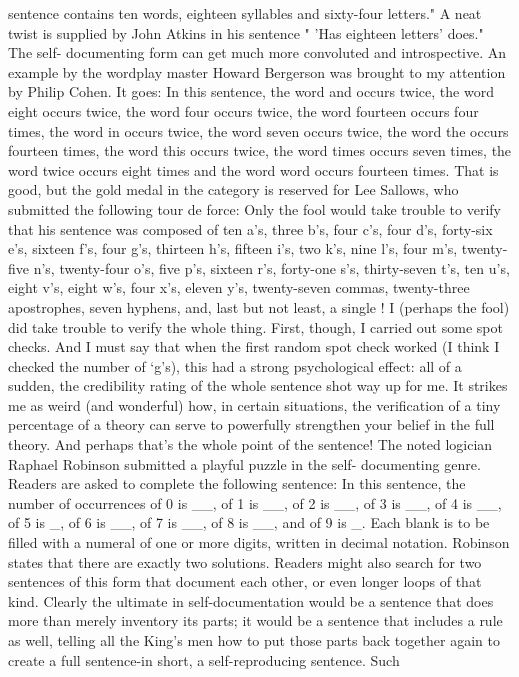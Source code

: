 sentence contains ten words, eighteen syllables and sixty-four letters." A neat twist is supplied by John Atkins in his sentence " 'Has eighteen letters' does." The self- documenting form can get much more convoluted and introspective. An example by the wordplay master Howard Bergerson was brought to my attention by Philip Cohen. It goes: 
In this sentence, the word and occurs twice, the word eight occurs twice, the word four occurs twice, the word fourteen occurs four times, the word in occurs twice, the word seven occurs twice, the word the occurs fourteen times, the word this occurs twice, the word times occurs seven times, the word twice occurs eight times and the word word occurs fourteen times. 
That is good, but the gold medal in the category is reserved for Lee Sallows, who submitted the following tour de force: 
Only the fool would take trouble to verify that his sentence was composed of ten a's, three b's, four c's, four d's, forty-six e's, sixteen f's, four g's, thirteen h's, fifteen i's, two k's, nine l's, four m's, twenty-five n's, twenty-four o's, five p's, sixteen r's, forty-one s's, thirty-seven t's, ten u's, eight v's, eight w's, four x's, eleven y's, twenty-seven commas, twenty-three apostrophes, seven hyphens, and, last but not least, a single ! 
I (perhaps the fool) did take trouble to verify the whole thing. First, though, I carried out some spot checks. And I must say that when the first random spot check worked (I think I checked the number of `g's), this had a strong psychological effect: all of a sudden, the credibility rating of the whole sentence shot way up for me. It strikes me as weird (and wonderful) how, in certain situations, the verification of a tiny percentage of a theory can serve to powerfully strengthen your belief in the full theory. And perhaps that's the whole point of the sentence! The noted logician Raphael Robinson submitted a playful puzzle in the self- documenting genre. Readers are asked to complete the following sentence: 
In this sentence, the number of occurrences of 0 is __, of 1 is __, of 2 is __, of 3 is __, of 4 is __, of 5 is _, of 6 is __, of 7 is __, of 8 is __, and of 9 is _. 
Each blank is to be filled with a numeral of one or more digits, written in decimal notation. Robinson states that there are exactly two solutions. Readers might also search for two sentences of this form that document each other, or even longer loops of that kind. Clearly the ultimate in self-documentation would be a sentence that does more than merely inventory its parts; it would be a sentence that includes a rule as well, telling all the King's men how to put those parts back together again to create a full sentence-in short, a self-reproducing sentence. Such 



